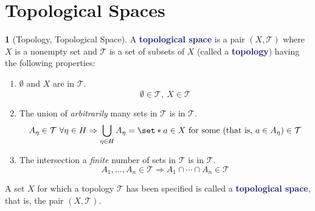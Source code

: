 \documentclass[11pt]{article}
\numberwithin{equation}{section}
\newcommand{\navy}[1]{\textcolor{MidnightBlue}{\bf #1}}
\theoremstyle{plain}
\theoremstyle{definition}
\newtheorem{definition}{\color{MidnightBlue}{\textbf{Definition}}}[section]
\def\Set{\set*}%
\def\imp{\Rightarrow}
\newcommand{\1}{\mathbbm 1}
\newcommand{\tT}{\mathcal T}
\begin{document}
\section{Topological Spaces}

\begin{definition}[Topology, Topological Space]
	A \navy{topological space} is a pair $(X,\tT)$ where $X$ is a nonempty set and $\tT$ is a set of subsets of $X$ (called a \navy{topology}) having the following properties:
	\begin{enumerate}
		\item $\emptyset$ and $X$ are in $\tT$.
		\begin{equation}
			\emptyset \in \tT,\ X \in \tT
		\end{equation}
		\item The union of \textit{arbitrarily} many sets in $\tT$ is in $\tT$.
		\begin{equation}
			A_\eta \in \tT \ \forall \eta \in H \imp \bigcup_{\eta \in H} A_\eta = \Set{a \in X \text{ for some (that is, } a \in A_\eta \text{)}} \in \tT
		\end{equation}
		\item The intersection a \textit{finite} number of sets in $\tT$ is in $\tT$.
		\begin{equation}
			A_1, \ldots, A_n \in \tT \imp A_1 \cap \cdots \cap A_n \in \tT
		\end{equation}
	\end{enumerate}
	A set $X$ for which a topology $\tT$ has been specified is called a \navy{topological space}, that is, the pair $(X,\tT)$.
\end{definition}
\end{document}
